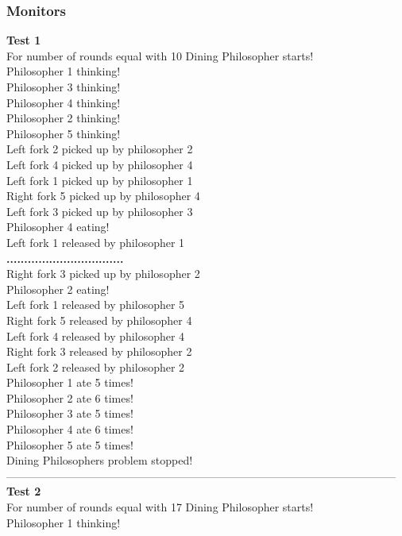 \documentclass[14pt]{article}
\begin{document}
\subsubsection{Monitors}
\textbf{Test 1}
\\For number of rounds equal with 10 Dining Philosopher starts!
\\Philosopher 1 thinking!
\\Philosopher 3 thinking!
\\Philosopher 4 thinking!
\\Philosopher 2 thinking!
\\Philosopher 5 thinking!
\\Left fork 2 picked up by philosopher 2
\\Left fork 4 picked up by philosopher 4
\\Left fork 1 picked up by philosopher 1
\\Right fork 5 picked up by philosopher 4
\\Left fork 3 picked up by philosopher 3
\\Philosopher 4 eating!
\\Left fork 1 released by philosopher 1
\\\textbf{.................................}
\\Right fork 3 picked up by philosopher 2
\\Philosopher 2 eating!
\\Left fork 1 released by philosopher 5
\\Right fork 5 released by philosopher 4
\\Left fork 4 released by philosopher 4
\\Right fork 3 released by philosopher 2
\\Left fork 2 released by philosopher 2
\\Philosopher 1 ate 5 times!
\\Philosopher 2 ate 6 times!
\\Philosopher 3 ate 5 times!
\\Philosopher 4 ate 6 times!
\\Philosopher 5 ate 5 times!
\\Dining Philosophers problem stopped!
\\---------------------------------------------------------------------------------------------------------
\\\textbf{Test 2}
\\For number of rounds equal with 17 Dining Philosopher starts!
\\Philosopher 1 thinking!
\end{document}
